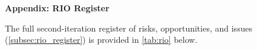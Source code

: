 %

\clearpage
\begin{landscape}
\pagestyle{empty}
\setlength{\textwidth}{\textheight}
\setlength{\linewidth}{\textwidth}

{}
{\large\bfseries\color{ercblue} Appendix: RIO Register}

\bigskip
\noindent The full second-iteration register of risks, opportunities, and
issues (\autoref{subsec:rio_register}) is provided in \autoref{tab:rio}
below.



\end{landscape}
\pagestyle{fancy}
\clearpage

